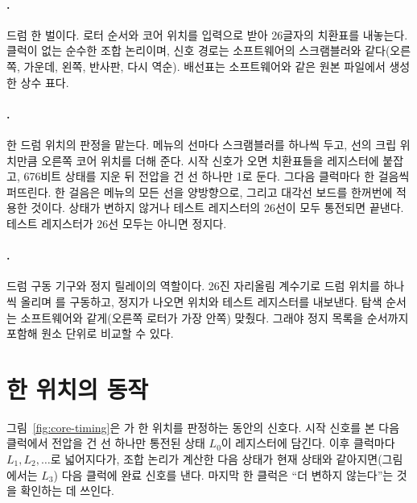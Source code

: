 \paragraph{.} 드럼 한 벌이다. 로터 순서와 코어 위치를 입력으로 받아 26글자의 치환표를
내놓는다. 클럭이 없는 순수한 조합 논리이며, 신호 경로는 소프트웨어의 스크램블러와 같다(오른쪽, 가운데,
왼쪽, 반사판, 다시 역순). 배선표는 소프트웨어와 같은 원본 파일에서 생성한 상수 표다.

\paragraph{.} 한 드럼 위치의 판정을 맡는다. 메뉴의 선마다 스크램블러를 하나씩 두고,
선의 크립 위치만큼 오른쪽 코어 위치를 더해 준다. 시작 신호가 오면 치환표들을 레지스터에 붙잡고, 676비트
상태를 지운 뒤 전압을 건 선 하나만 1로 둔다. 그다음 클럭마다 한 걸음씩 퍼뜨린다. 한 걸음은 메뉴의 모든
선을 양방향으로, 그리고 대각선 보드를 한꺼번에 적용한 것이다. 상태가 변하지 않거나 테스트 레지스터의
26선이 모두 통전되면 끝낸다. 테스트 레지스터가 26선 모두는 아니면 정지다.

\paragraph{.} 드럼 구동 기구와 정지 릴레이의 역할이다. 26진 자리올림 계수기로 드럼
위치를 하나씩 올리며 를 구동하고, 정지가 나오면 위치와 테스트 레지스터를 내보낸다.
탐색 순서는 소프트웨어와 같게(오른쪽 로터가 가장 안쪽) 맞췄다. 그래야 정지 목록을 순서까지 포함해
원소 단위로 비교할 수 있다.

\section{한 위치의 동작}

그림~\ref{fig:core-timing}은 가 한 위치를 판정하는 동안의 신호다. 시작 신호를 본 다음
클럭에서 전압을 건 선 하나만 통전된 상태 $L_0$이 레지스터에 담긴다. 이후 클럭마다 $L_1, L_2, \ldots$로
넓어지다가, 조합 논리가 계산한 다음 상태가 현재 상태와 같아지면(그림에서는 $L_3$) 다음 클럭에 완료
신호를 낸다. 마지막 한 클럭은 ``더 변하지 않는다''는 것을 확인하는 데 쓰인다.

